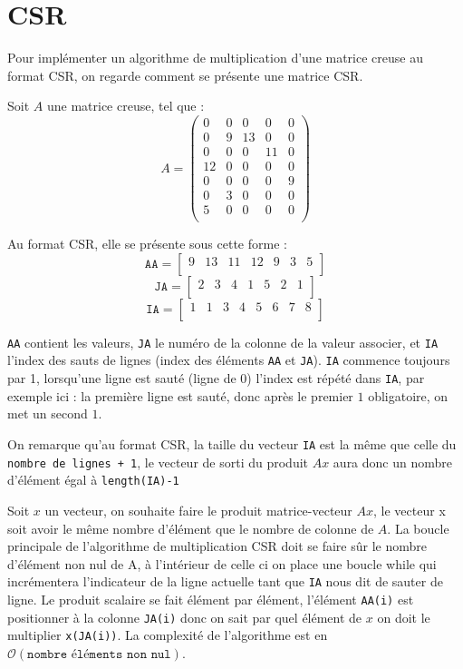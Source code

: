 \documentclass{article}
\begin{document}
\section{CSR}

Pour implémenter un algorithme de multiplication d'une matrice creuse au format CSR, on regarde comment se présente une matrice CSR.

Soit \(A\) une matrice creuse, tel que :
\[
A = 
\begin{pmatrix}
	0	&	0	&	0	&	0	& 0	\\
	0	&	9	&	13	&	0	& 0	\\
	0	&	0	&	0	&	11	& 0	\\
	12	&	0	&	0	&	0	& 0	\\
	0	&	0	&	0	&	0	& 9	\\
	0	&	3	&	0	&	0	& 0	\\
	5	&	0	&	0	&	0	& 0	\\
\end{pmatrix}
\]

Au format CSR, elle se présente sous cette forme :
\[
\texttt{AA}  = 
\begin{bmatrix}
9	&	13	&	11	&	12	&	9	&	3	&	5	\\
\end{bmatrix}
\]
\[
\texttt{JA}  = 
\begin{bmatrix}
2	&	3	&	4	&	1	&	5	&	2	&	1	\\
\end{bmatrix}
\]
\[
\texttt{IA}  = 
\begin{bmatrix}
1	&	1	&	3	&	4	&	5	&	6	&	7	&	8	\\
\end{bmatrix}
\]

\texttt{AA} contient les valeurs, \texttt{JA} le numéro de la colonne de la valeur associer, et \texttt{IA} l'index des sauts de lignes (index des éléments \texttt{AA} et \texttt{JA}). \texttt{IA} commence toujours par 1, lorsqu'une ligne est sauté (ligne de 0) l'index est répété dans \texttt{IA}, par exemple ici : la première ligne est sauté, donc après le premier \(1\) obligatoire, on met un second \(1\).

On remarque qu'au format CSR, la taille du vecteur \texttt{IA} est la même que celle du \texttt{nombre de lignes + 1}, le vecteur de sorti du produit \(Ax\) aura donc un nombre d'élément égal à \texttt{length(IA)-1}

Soit \(x\) un vecteur, on souhaite faire le produit matrice-vecteur \(Ax\), le vecteur x soit avoir le même nombre d'élément que le nombre de colonne de \(A\).
La boucle principale de l'algorithme de multiplication CSR doit se faire sûr le nombre d'élément non nul de A, à l'intérieur de celle ci on place une boucle while qui incrémentera l'indicateur de la ligne actuelle tant que \texttt{IA} nous dit de sauter de ligne. Le produit scalaire se fait élément par élément, l'élément \texttt{AA(i)} est positionner à la colonne \texttt{JA(i)} donc on sait par quel élément de \(x\) on doit le multiplier \texttt{x(JA(i))}. La complexité de l'algorithme est en \(\mathcal{O}(\texttt{nombre\ éléments\ non\ nul})\).
\end{document}
